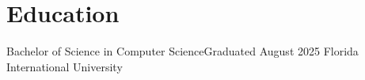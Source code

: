 
\section{Education}
  \subheadingListStart
    \subheading
      {Bachelor of Science in Computer Science}{Graduated August 2025}
      {Florida International University}{} %
  \subheadingListEnd